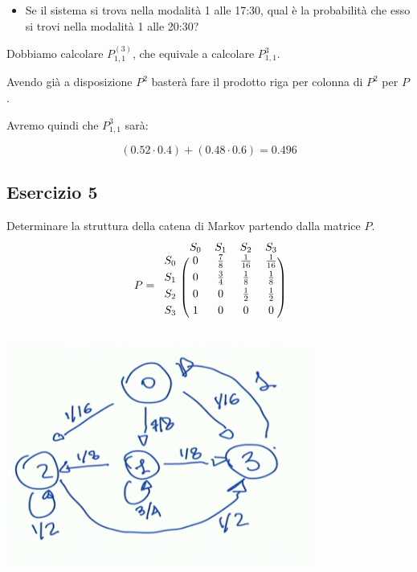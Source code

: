 \documentclass{article}
\begin{document}
\begin{itemize}
	\item Se il sistema si trova nella modalità 1 alle 17:30, qual è la probabilità che esso si trovi nella
	modalità 1 alle 20:30?
\end{itemize}


Dobbiamo calcolare $P^{(3)}_{1,1}$, che equivale a calcolare $P^3_{1,1}$.

Avendo già a disposizione $P^2$ basterà fare il prodotto riga per colonna di $P^2$ per $P$.

Avremo quindi che $P^3_{1,1}$ sarà:

\[
	(0.52 \cdot 0.4 ) + (0.48 \cdot 0.6) = 0.496
\]

\pagebreak

\subsection{Esercizio 5}

Determinare la struttura della catena di Markov partendo dalla matrice $P$.
\[
P = 
\begin{blockarray}{ccccc}
	& S_0 & S_1 & S_2 & S_3 \\
	\begin{block}{c(cccc)}
			\vspace{0.1cm}
		S_0 &   0 &	\frac{7}{8} & \frac{1}{16}   & \frac{1}{16} \\
		\vspace{0.1cm}
		S_1 &   0 &	\frac{3}{4} & \frac{1}{8}    & \frac{1}{8} \\
		\vspace{0.1cm}
		S_2 &	0 & 0           & \frac{1}{2}    & \frac{1}{2} \\
		\vspace{0.1cm}
		S_3 &	1 & 0           &  0             &  0 \\
	\end{block}
\end{blockarray}
\]	

\begin{center}
	\includegraphics[width=10cm]{./immagini/es2}
\end{center}
\end{document}

